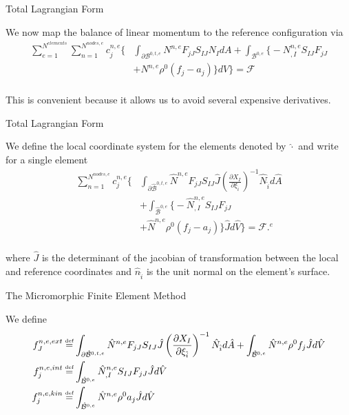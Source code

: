 \documentclass[11pt]{beamer}
\newcommand\defeq{\mathrel{\stackrel{\makebox[0pt]{\mbox{\normalfont\tiny def}}}{=}}}
\begin{document}
\begin{frame}{Total Lagrangian Form}

We now map the balance of linear momentum to the reference configuration via
\begin{align*}
\sum_{e=1}^{N^{elements}} \sum_{n=1}^{N^{nodes,e}} c^{n,e}_j \bigg\{&\int_{\partial \mathcal{B}^{0,t,e}} N^{n,e} F_{jJ} S_{IJ} N_{I} dA + \int_{\mathcal{B}^{0,e}} \big\{- N^{n,e}_{,I} S_{IJ} F_{jJ}\\
& + N^{n,e} \rho^0 \left(f_j - a_j\right) \big\} dV \bigg\} = \mathcal{F}\\
\end{align*}

This is convenient because it allows us to avoid several expensive derivatives.

\end{frame}

\begin{frame}{Total Lagrangian Form}

We define the local coordinate system for the elements denoted by $\hat{\cdot}$ and write for a single element
\begin{align*}
\sum_{n=1}^{N^{nodes,e}} c^{n,e}_j \bigg\{&\int_{\partial \hat{\mathcal{B}}^{0,t,e}} \hat{N}^{n,e} F_{jJ} S_{IJ} \hat{J} \left(\frac{\partial X_{I}}{\partial \xi_{\hat{i}}}\right)^{-1} \hat{N}_{\hat{i}} d\hat{A}\\
& + \int_{\hat{\mathcal{B}}^{0,e}} \big\{- \hat{N}^{n,e}_{,I} S_{IJ} F_{jJ}\\
& + \hat{N}^{n,e} \rho^0 \left(f_j - a_j\right) \big\} \hat{J} d\hat{V} \bigg\} = \mathcal{F}. ^{e}\\
\end{align*}

where $\hat{J}$ is the determinant of the jacobian of transformation between the local and reference coordinates and $\hat{n}_{\hat{i}}$ is the unit normal on the element's surface.

\end{frame}

\begin{frame}{The Micromorphic Finite Element Method}

We define
\begin{align*}
f_{J}^{n,e,ext} &\defeq \int_{\partial \hat{\mathcal{B}}^{0,t,e}} \hat{N}^{n,e} F_{jJ} S_{IJ} \hat{J} \left(\frac{\partial X_{I}}{\partial \xi_{\hat{i}}}\right)^{-1} \hat{N}_{\hat{i}} d\hat{A} + \int_{\hat{\mathcal{B}}^{0,e}}  \hat{N}^{n,e} \rho^0 f_j \hat{J} d\hat{V}\\
f_{j}^{n,e,int} &\defeq \int_{\hat{\mathcal{B}}^{0,e}}\hat{N}^{n,e}_{,I} S_{IJ} F_{jJ} \hat{J} d\hat{V}\\
f_{j}^{n,e,kin} &\defeq \int_{\hat{\mathcal{B}}^{0,e}} \hat{N}^{n,e} \rho^0 a_j \hat{J} d\hat{V}\\
\end{align*}

\end{frame}
\end{document}
